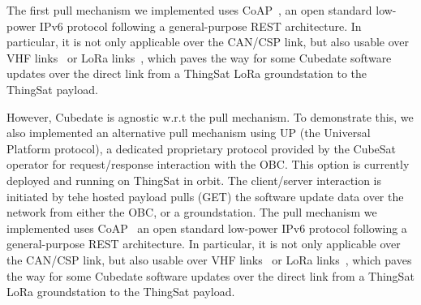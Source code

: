 The first pull mechanism we implemented uses CoAP~\cite{rfc7252}, an open standard
low-power IPv6 protocol following a general-purpose REST architecture. In particular,
it is not only applicable over the CAN/CSP link, but also usable over VHF links~\cite{palma2018vhf-coap}
or LoRa links~\cite{sanchez2018lora-coap}, which paves the way for some Cubedate
software updates over the direct link from a ThingSat LoRa groundstation to the ThingSat payload.

However, Cubedate is agnostic w.r.t the pull mechanism. To demonstrate this, we
also implemented an alternative pull mechanism using UP (the Universal Platform protocol),
a dedicated proprietary protocol provided by the CubeSat operator for request/response
interaction with the OBC. This option is currently deployed and running on ThingSat in orbit.
\fi
The client/server interaction is initiated by tehe hosted payload pulls (GET) the software update data over the
network from either the OBC, or a groundstation. The pull mechanism we implemented uses CoAP~\cite{rfc7252}
an open standard low-power IPv6 protocol following a general-purpose REST architecture. In particular,
it is not only applicable over the CAN/CSP link, but also usable over VHF links~\cite{palma2018vhf-coap}
or LoRa links~\cite{sanchez2018lora-coap}, which paves the way for some Cubedate
software updates over the direct link from a ThingSat LoRa groundstation to the ThingSat payload.
